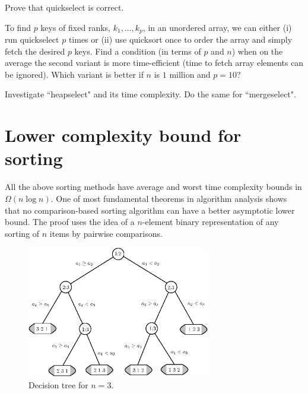 \begin{Exercise}\label{exr:quickselect-correctness}
Prove that quickselect is correct.
\end{Exercise}

\begin{Exercise}\label{exr:select:ranks}
To find \(p\) keys of fixed ranks, \(k_1 , \ldots, k_p \),
in an unordered array, we can either (i) run quickselect \(p\)
times or (ii) use quicksort once to order the array and simply
fetch the desired \(p\) keys. Find a condition (in terms of
\(p\) and \(n\)) when on the average the second variant is more
time-efficient (time to fetch array elements can be ignored). 
Which variant is better if $n$ is $1$ million and \(p=10\)?
\end{Exercise}

\begin{Exercise}\label{ex:heapselect}
Investigate ``heapselect" and its time complexity. Do the same for 
``mergeselect".
\end{Exercise}

\section{Lower complexity bound for sorting}
\label{sec:lower:bound}

All the above sorting methods have average and worst time complexity bounds in 
$\Omega(n \log n)$. One of most fundamental theorems in algorithm analysis 
shows that no comparison-based sorting algorithm can have a better asymptotic 
lower bound. The proof uses the idea of a $n$-element binary 
 representation of any sorting of $n$ items by pairwise comparisons. 

\begin{figure}[htb!]
\centerline{
\includegraphics[width=80mm]{figs/tree123ipe.eps}
}
\caption{\label{tree123} Decision tree for $n=3$.}
\end{figure}

